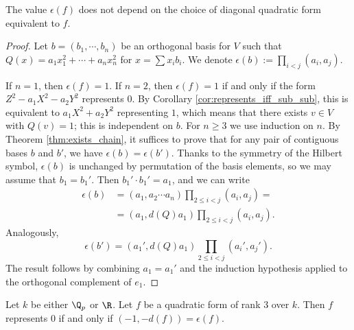\begin{lemma}\label{lem:HM_inv_well_defined}
\leanok
The value $\epsilon(f)$ does not depend on the choice of diagonal quadratic form equivalent to $f$.
\end{lemma}
\begin{proof}
Let $b = (b_1, \cdots, b_n)$ be an orthogonal basis for $V$ such that $Q(x) = a_1 x_1^2 + \cdots + a_n x_n^2$ for $x = \sum x_i b_i$. We denote  $\epsilon(b) := \prod_{i < j}(a_i, a_j)$.

If $n=1$, then $\epsilon(f) = 1$. If $n=2$, then $\epsilon(f) = 1$ if and only if the form $Z^2 - a_1 X^2 - a_2 Y^2$ represents $0$. By Corollary \ref{cor:represents_iff_sub_sub}, this is equivalent to $a_1 X^2 + a_2 Y^2$ representing $1$, which means that there exists $v \in V$ with $Q(v) = 1$; this is independent on $b$.
For $n \ge 3$ we use induction on $n$. By Theorem \ref{thm:exists_chain}, it suffices to prove that for any pair of contiguous bases $b$ and $b'$, we have $\epsilon(b) = \epsilon(b')$.
Thanks to the symmetry of the Hilbert symbol, $\epsilon(b)$ is unchanged by permutation of the basis elements, so we may assume that $b_1 = b_1'$.
Then $b_1' \cdot b_1' = a_1$, and we can write
\begin{align*}
	\epsilon(b) &= (a_1, a_2 \cdots a_n) \prod_{2 \le i < j} (a_i, a_j) = \\
	&= (a_1, d(Q) a_1) \prod_{2 \le i < j} (a_i, a_j).
\end{align*}
Analogously, \[\epsilon(b') = (a_1', d(Q) a_1) \prod_{2 \le i < j} (a_i', a_j'). \]
The result follows by combining $a_1 = a_1'$ and the induction hypothesis applied to the orthogonal complement of $e_1$.
\end{proof}

\begin{lemma}\label{lem:represents_zero_iff_rk_3}
\leanok
{}
Let $k$ be either $\Q_p$ or $\R$. Let $f$ be a quadratic form of rank $3$ over $k$. Then $f$ represents $0$ if and only if $(-1, -d(f)) = \epsilon(f)$.
\end{lemma}

